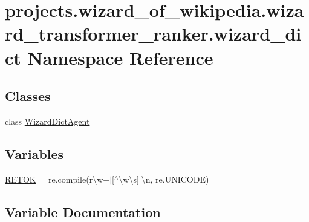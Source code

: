 \hypertarget{namespaceprojects_1_1wizard__of__wikipedia_1_1wizard__transformer__ranker_1_1wizard__dict}{}\section{projects.\+wizard\+\_\+of\+\_\+wikipedia.\+wizard\+\_\+transformer\+\_\+ranker.\+wizard\+\_\+dict Namespace Reference}
\label{namespaceprojects_1_1wizard__of__wikipedia_1_1wizard__transformer__ranker_1_1wizard__dict}
\subsection*{Classes}
\begin{DoxyCompactItemize}
\item 
class \hyperlink{classprojects_1_1wizard__of__wikipedia_1_1wizard__transformer__ranker_1_1wizard__dict_1_1WizardDictAgent}{Wizard\+Dict\+Agent}
\end{DoxyCompactItemize}
\subsection*{Variables}
\begin{DoxyCompactItemize}
\item 
\hyperlink{namespaceprojects_1_1wizard__of__wikipedia_1_1wizard__transformer__ranker_1_1wizard__dict_a7d0602ca809535e0fb49318ed85a0dec}{R\+E\+T\+OK} = re.\+compile(r\textquotesingle{}\textbackslash{}w+$\vert$\mbox{[}$^\wedge$\textbackslash{}w\textbackslash{}s\mbox{]}$\vert$\textbackslash{}n\textquotesingle{}, re.\+U\+N\+I\+C\+O\+DE)
\end{DoxyCompactItemize}


\subsection{Variable Documentation}
\mbox{\label{namespaceprojects_1_1wizard__of__wikipedia_1_1wizard__transformer__ranker_1_1wizard__dict_a7d0602ca809535e0fb49318ed85a0dec}} 
